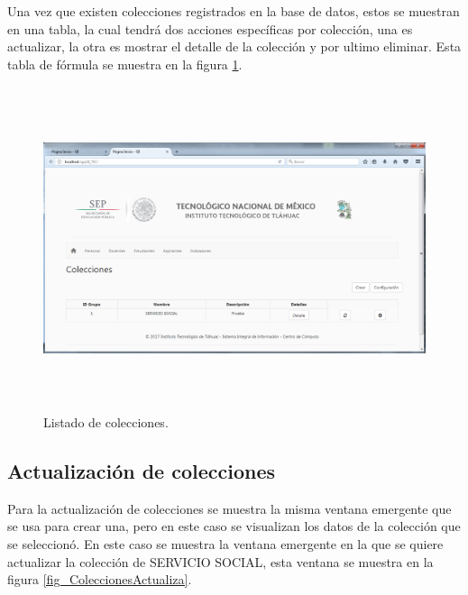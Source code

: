 		    Una vez que existen colecciones registrados en la base de datos, estos se muestran en una tabla, la cual tendr\'a dos acciones espec\'ificas por colecci\'on, una es actualizar, la otra es mostrar el detalle de la colecci\'on y por ultimo eliminar. Esta tabla de f\'ormula se muestra en la figura \ref{fig_ColeccionesTabla}.\\

		    \begin{figure}[]
		        \centering
		        \includegraphics[width=16cm, height=9.5cm]{figuras/ColeccionesTabla}
		        \caption{Listado de colecciones.}
		        \label{fig_ColeccionesTabla}
		    \end{figure}
			
			\subsection{Actualizaci\'on de colecciones}

			Para la actualizaci\'on de colecciones se muestra la misma ventana emergente que se usa para crear una, pero en este caso se visualizan los datos de la colecci\'on que se seleccion\'o. En este caso se muestra la ventana emergente en la que se quiere actualizar la colecci\'on de SERVICIO SOCIAL, esta ventana se muestra en la figura \ref{fig_ColeccionesActualiza}.

